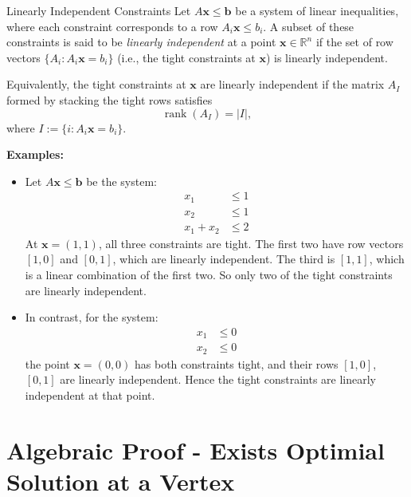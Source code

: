 \vspace{1em}

\begin{definition}{Linearly Independent Constraints}{}{}
Let \( A \mathbf{x} \leq \mathbf{b} \) be a system of linear inequalities, where each constraint corresponds to a row \( A_i \mathbf{x} \leq b_i \). A subset of these constraints is said to be \emph{linearly independent} at a point \( \mathbf{x} \in \mathbb{R}^n \) if the set of row vectors \( \{ A_i : A_i \mathbf{x} = b_i \} \) (i.e., the tight constraints at \( \mathbf{x} \)) is linearly independent.

Equivalently, the tight constraints at \( \mathbf{x} \) are linearly independent if the matrix \( A_I \) formed by stacking the tight rows satisfies
\[
\operatorname{rank}(A_I) = |I|,
\]
where \( I := \{ i : A_i \mathbf{x} = b_i \} \).
\end{definition}

\textbf{Examples:}
\begin{itemize}
    \item Let \( A \mathbf{x} \leq \mathbf{b} \) be the system:
    \[
    \begin{aligned}
    x_1 &\leq 1 \\
    x_2 &\leq 1 \\
    x_1 + x_2 &\leq 2
    \end{aligned}
    \]
    At \( \mathbf{x} = (1, 1) \), all three constraints are tight. The first two have row vectors \( [1,0] \) and \( [0,1] \), which are linearly independent. The third is \( [1,1] \), which is a linear combination of the first two. So only two of the tight constraints are linearly independent.
    
    \item In contrast, for the system:
    \[
    \begin{aligned}
    x_1 &\leq 0 \\
    x_2 &\leq 0
    \end{aligned}
    \]
    the point \( \mathbf{x} = (0,0) \) has both constraints tight, and their rows \( [1,0] \), \( [0,1] \) are linearly independent. Hence the tight constraints are linearly independent at that point.
\end{itemize}


\section{Algebraic Proof - Exists Optimial Solution at a Vertex}



